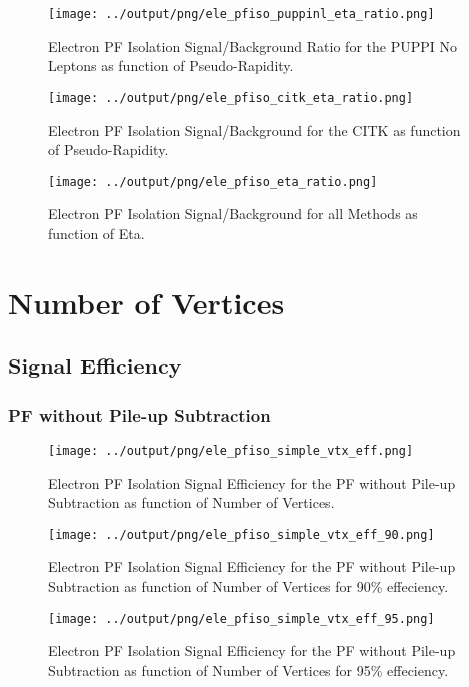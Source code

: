 \documentclass[11pt]{book}
\begin{document}
\begin{figure}[htb]
\centering
\texttt{[image: ../output/png/ele\_pfiso\_puppinl\_eta\_ratio.png]}
\caption{Electron PF Isolation Signal/Background Ratio for the PUPPI No Leptons as function of Pseudo-Rapidity.}
\label{fig:ele_pfiso_eta_ratio_puppinl}
\end{figure}

\begin{figure}[htb]
\centering
\texttt{[image: ../output/png/ele\_pfiso\_citk\_eta\_ratio.png]}
\caption{Electron PF Isolation Signal/Background for the CITK as function of Pseudo-Rapidity.}
\label{fig:ele_pfiso_eta_ratio_citk}
\end{figure}

\begin{figure}[htb]
\centering
\texttt{[image: ../output/png/ele\_pfiso\_eta\_ratio.png]}
\caption{Electron PF Isolation Signal/Background for all Methods as function of Eta.}
\label{fig:ele_pfiso_eta_ratio}
\end{figure}
\clearpage

\chapter{Number of Vertices}
\section{Signal Efficiency}
\subsection{PF without Pile-up Subtraction}
\begin{figure}[htb]
\centering
\texttt{[image: ../output/png/ele\_pfiso\_simple\_vtx\_eff.png]}
\caption{Electron PF Isolation Signal Efficiency for the PF without Pile-up Subtraction as function of Number of Vertices.}
\label{fig:ele_pfiso_vtx_eff_simple}
\end{figure}

\begin{figure}[htb]
\centering
\texttt{[image: ../output/png/ele\_pfiso\_simple\_vtx\_eff\_90.png]}
\caption{Electron PF Isolation Signal Efficiency for the PF without Pile-up Subtraction as function of Number of Vertices for 90\% effeciency.}
\label{fig:ele_pfiso_vtx_eff_simple_eff_90}
\end{figure}

\begin{figure}[htb]
\centering
\texttt{[image: ../output/png/ele\_pfiso\_simple\_vtx\_eff\_95.png]}
\caption{Electron PF Isolation Signal Efficiency for the PF without Pile-up Subtraction as function of Number of Vertices for 95\% effeciency.}
\label{fig:ele_pfiso_vtx_eff_simple_eff_95}
\end{figure}
\end{document}
